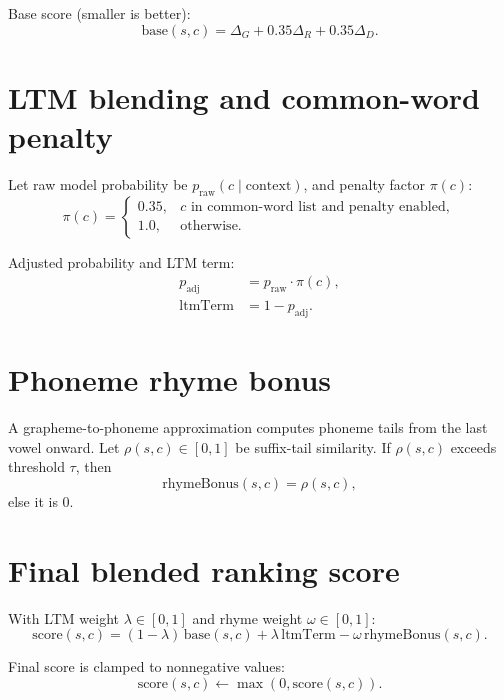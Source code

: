 \documentclass[11pt,a4paper]{report}
\begin{document}
Base score (smaller is better):
\begin{equation}
\text{base}(s,c) = \Delta_G + 0.35\Delta_R + 0.35\Delta_D.
\end{equation}

\section{LTM blending and common-word penalty}
Let raw model probability be $p_{\text{raw}}(c\mid\text{context})$, and penalty factor $\pi(c)$:
\begin{equation}
\pi(c) =
\begin{cases}
0.35, & c \text{ in common-word list and penalty enabled},\\
1.0, & \text{otherwise}.
\end{cases}
\end{equation}

Adjusted probability and LTM term:
\begin{align}
p_{\text{adj}} &= p_{\text{raw}}\cdot \pi(c), \\
\text{ltmTerm} &= 1 - p_{\text{adj}}.
\end{align}

\section{Phoneme rhyme bonus}
A grapheme-to-phoneme approximation computes phoneme tails from the last vowel onward. Let
$\rho(s,c) \in [0,1]$ be suffix-tail similarity. If $\rho(s,c)$ exceeds threshold $\tau$, then
\begin{equation}
\text{rhymeBonus}(s,c) = \rho(s,c),
\end{equation}
else it is $0$.

\section{Final blended ranking score}
With LTM weight $\lambda \in [0,1]$ and rhyme weight $\omega \in [0,1]$:
\begin{equation}
\text{score}(s,c) = (1-\lambda)\,\text{base}(s,c) + \lambda\,\text{ltmTerm} - \omega\,\text{rhymeBonus}(s,c).
\end{equation}

Final score is clamped to nonnegative values:
\begin{equation}
\text{score}(s,c) \leftarrow \max(0,\text{score}(s,c)).
\end{equation}
\end{document}
